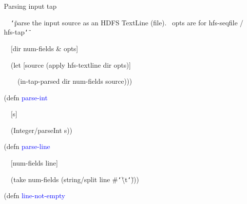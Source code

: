 \documentclass{beamer}
\renewcommand{\textquotedbl}{\texttt{\char`\"}}
\begin{document}
\begin{frame}[allowframebreaks]{Parsing input tap}
\begin{small}
{\ttfamily\color{black}
\ \ \textcolor[rgb]{0.54509807,0.13333334,0.32156864}{{\textquotedbl}parse
the input source as an HDFS TextLine (file). \ opts are for hfs-seqfile
/ hfs-tap{\textquotedbl}}}

{\ttfamily\color{black}
\ \ [dir num-fields \& opts]}

{\ttfamily\color{black}
\ \ \textcolor[rgb]{0.54901963,0.54901963,0.54901963}{(}\textcolor[rgb]{0.49803922,0.0,0.49803922}{let}
[source
\textcolor[rgb]{0.54901963,0.54901963,0.54901963}{(}\textcolor[rgb]{0.28235295,0.23921569,0.54509807}{apply}
hfs-textline dir
opts\textcolor[rgb]{0.54901963,0.54901963,0.54901963}{)}]}

{\ttfamily\color{black}
\ \ \ \ \textcolor[rgb]{0.54901963,0.54901963,0.54901963}{(}in-tap-parsed
dir num-fields
source\textcolor[rgb]{0.54901963,0.54901963,0.54901963}{)))}}

\end{small}

\bigskip

\begin{small}
{\ttfamily\color{black}
\textcolor[rgb]{0.54901963,0.54901963,0.54901963}{(}\textcolor[rgb]{0.49803922,0.0,0.49803922}{defn}
\textcolor{blue}{parse-int}}

{\ttfamily\color{black}
\ \ [s]}

{\ttfamily\color{black}
\ \ \textcolor[rgb]{0.54901963,0.54901963,0.54901963}{(}\textcolor[rgb]{0.28235295,0.23921569,0.54509807}{Integer/parseInt}
s\textcolor[rgb]{0.54901963,0.54901963,0.54901963}{))}}
\end{small}

\bigskip

\begin{small}
{\ttfamily\color{black}
\textcolor[rgb]{0.54901963,0.54901963,0.54901963}{(}\textcolor[rgb]{0.49803922,0.0,0.49803922}{defn}
\textcolor{blue}{parse-line}}

{\ttfamily\color{black}
\ \ [num-fields line]}

{\ttfamily\color{black}
\ \ \textcolor[rgb]{0.54901963,0.54901963,0.54901963}{(}\textcolor[rgb]{0.28235295,0.23921569,0.54509807}{take}
num-fields
\textcolor[rgb]{0.54901963,0.54901963,0.54901963}{(}string/split line
\#\textcolor[rgb]{0.54509807,0.13333334,0.32156864}{{\textquotedbl}{\textbackslash}t{\textquotedbl}}\textcolor[rgb]{0.54901963,0.54901963,0.54901963}{)))}}


\bigskip

{\ttfamily\color{black}
\textcolor[rgb]{0.54901963,0.54901963,0.54901963}{(}\textcolor[rgb]{0.49803922,0.0,0.49803922}{defn}
\textcolor{blue}{line-not-empty}}


\end{small}
\end{frame}
\end{document}

